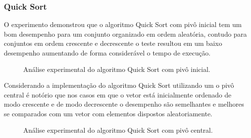 \documentclass[conference]{IEEEtran}
\begin{document}
\subsubsection{Quick Sort}
O experimento demonstrou que o algoritmo Quick Sort com pivô inicial tem um bom desempenho para um conjunto organizado em ordem aleatória, contudo para conjuntos em ordem crescente e decrescente o teste resultou em um baixo desempenho aumentando de forma considerável o tempo de execução.

\begin{figure}
\label{image: graph-quick-inicial}

\caption{Análise experimental do algoritmo Quick Sort com pivô inicial.}
\end{figure}


Considerando a implementação do algoritmo Quick Sort utilizando um o pivô central é notório que nos casos em que o vetor está inicialmente ordenado de modo crescente e de modo decrescente o desempenho são semelhantes e melhores se comparados com um vetor com elementos dispostos aleatoriamente. 

\begin{figure}
\label{image: graph-quick-central}

\caption{Análise experimental do algoritmo Quick Sort com pivô central.}
\end{figure}
\end{document}
